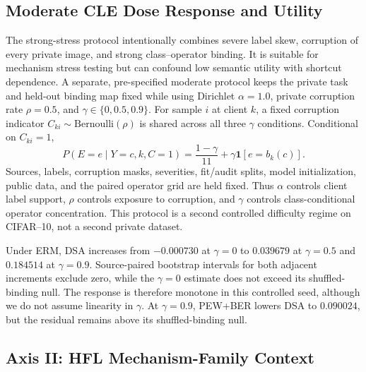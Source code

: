 
\subsection{Moderate CLE Dose Response and Utility}

The strong-stress protocol intentionally combines severe label skew, corruption of every private image, and strong class--operator binding. It is suitable for mechanism stress testing but can confound low semantic utility with shortcut dependence. A separate, pre-specified moderate protocol keeps the private task and held-out binding map fixed while using Dirichlet $\alpha=1.0$, private corruption rate $\rho=0.5$, and $\gamma\in\{0,0.5,0.9\}$. For sample $i$ at client $k$, a fixed corruption indicator $C_{ki}\sim\mathrm{Bernoulli}(\rho)$ is shared across all three $\gamma$ conditions. Conditional on $C_{ki}=1$,
\[
P(E=e\mid Y=c,k,C=1)=\frac{1-\gamma}{11}+\gamma\mathbf{1}[e=b_k(c)].
\]
Sources, labels, corruption masks, severities, fit/audit splits, model initialization, public data, and the paired operator grid are held fixed. Thus $\alpha$ controls client label support, $\rho$ controls exposure to corruption, and $\gamma$ controls class-conditional operator concentration. This protocol is a second controlled difficulty regime on CIFAR--10, not a second private dataset.



Under ERM, DSA increases from \(-0.000730\) at \(\gamma=0\) to \(0.039679\) at \(\gamma=0.5\) and \(0.184514\) at \(\gamma=0.9\). Source-paired bootstrap intervals for both adjacent increments exclude zero, while the \(\gamma=0\) estimate does not exceed its shuffled-binding null. The response is therefore monotone in this controlled seed, although we do not assume linearity in \(\gamma\). At \(\gamma=0.9\), PEW+BER lowers DSA to \(0.090024\), but the residual remains above its shuffled-binding null.

\subsection{Axis II: HFL Mechanism-Family Context}

